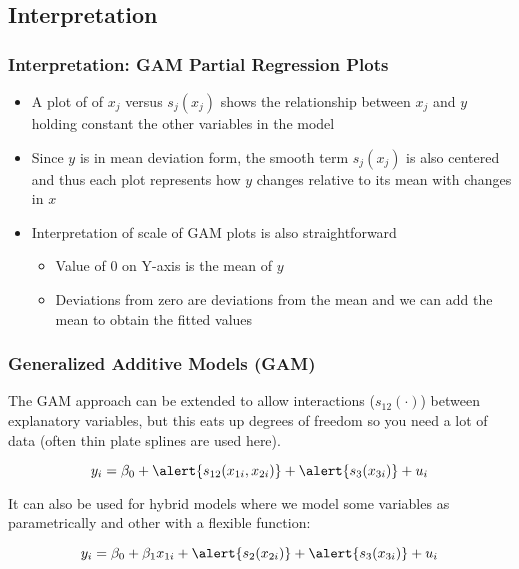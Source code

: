 \documentclass{beamer}
\numberwithin{equation}{section}
\begin{document}
\subsection{Interpretation}

 \begin{frame}[fragile]
\frametitle{Interpretation: GAM Partial Regression Plots}
\small
\begin{itemize}
  \item  A plot of of $x_j$ versus $s_j(x_j)$ shows the relationship between $x_j$ and $y$ holding constant the other variables in the model
  \item Since $y$ is in mean deviation form, the smooth term $s_j(x_j)$ is also centered and thus each plot represents how $y$ changes \alert{relative to its mean} with changes in $x$
  \item Interpretation of scale of GAM plots is also straightforward
  
  \begin{itemize}
  
 \item Value of 0 on Y-axis is the mean of $y$\medskip
 \item Deviations from zero are deviations from the mean and we can add the mean to obtain the fitted values 
      \end{itemize}
  
\end{itemize}
\end{frame}



 \begin{frame}[fragile]
\frametitle{Generalized Additive Models (GAM)}

The GAM approach can be extended to allow \alert{interactions} ($s_{12}(\cdot)$) between explanatory variables, but this eats up degrees of freedom so you need a lot of data (often thin plate splines are used here).

$$
y_i = \beta_0 + \alert{s_{12}(x_{1i}, x_{2i})} + \alert{s_3(x_{3i})} + u_i
$$\bigskip \pause

It can also be used for \alert{hybrid models} where we model some variables as parametrically and other with a flexible function:

$$
y_i = \beta_0 + \beta_1 x_{1i} + \alert{s_2(x_{2i})} + \alert{s_3(x_{3i})} + u_i
$$

\end{frame}
\end{document}

